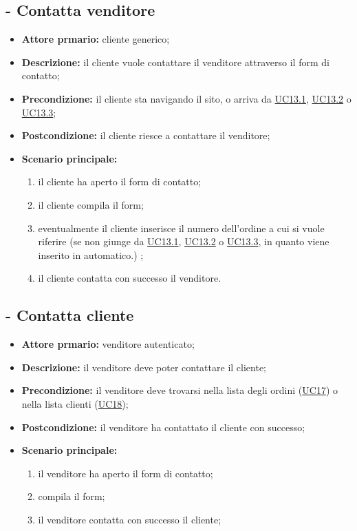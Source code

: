 \stepUserCase
\subsection{ - Contatta venditore}
\begin{itemize}
    \item \textbf{Attore prmario:} cliente generico;
    \item \textbf{Descrizione:} il cliente vuole contattare il venditore attraverso il form di contatto;
    \item \textbf{Precondizione:} il cliente sta navigando il sito, o arriva da \hyperref[UC13.1]{UC13.1}, \hyperref[UC13.2]{UC13.2} o \hyperref[UC13.3]{UC13.3};
    \item \textbf{Postcondizione:} il cliente riesce a contattare il venditore;
    \item \textbf{Scenario principale:}
          \begin{enumerate}
              \item il cliente ha aperto il form di contatto;
              \item il cliente compila il form;
              \item eventualmente il cliente inserisce il numero dell'ordine a cui si vuole riferire (se non giunge da \hyperref[UC13.1]{UC13.1}, \hyperref[UC13.2]{UC13.2} o \hyperref[UC13.3]{UC13.3}, in quanto viene inserito in automatico.) ;
              \item il cliente contatta con successo il venditore.
          \end{enumerate}
\end{itemize}


\stepUserCase
\subsection{ - Contatta cliente}
\begin{itemize}
    \item \textbf{Attore prmario:} venditore autenticato;
    \item \textbf{Descrizione:} il venditore deve poter contattare il cliente;
    \item \textbf{Precondizione:} il venditore deve trovarsi nella lista degli ordini (\hyperref[UC17]{UC17}) o nella lista clienti (\hyperref[UC18]{UC18});
    \item \textbf{Postcondizione:} il venditore ha contattato il cliente con successo;
    \item \textbf{Scenario principale:}
          \begin{enumerate}
              \item il venditore ha aperto il form di contatto;
              \item compila il form;
              \item il venditore contatta con successo il cliente;
          \end{enumerate}
\end{itemize}


